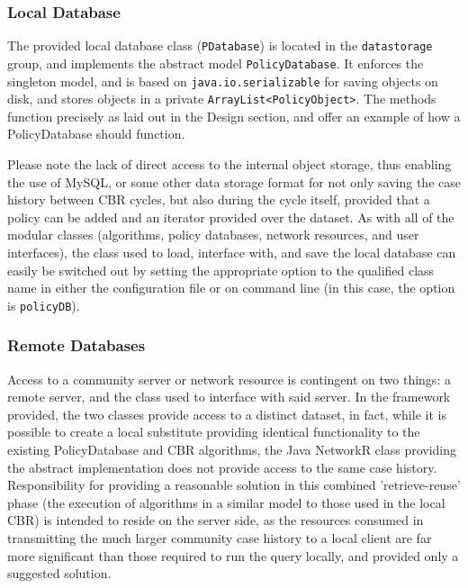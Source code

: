 \subsubsection{Local Database}
The provided local database class (\texttt{PDatabase}) is located in the \texttt{datastorage} group, and implements the abstract model \texttt{PolicyDatabase}. It enforces the singleton model, and is based on \texttt{java.io.serializable} for saving objects on disk, and stores objects in a private \texttt{ArrayList<PolicyObject>}. The methods function precisely as laid out in the Design section, and offer an example of how a PolicyDatabase should function.

Please note the lack of direct access to the internal object storage, thus enabling the use of MySQL, or some other data storage format for not only saving the case history between CBR cycles, but also during the cycle itself, provided that a policy can be added and an iterator provided over the dataset. As with all of the modular classes (algorithms, policy databases, network resources, and user interfaces), the class used to load, interface with, and save the local database can easily be switched out by setting the appropriate  option to the qualified class name in either the configuration file or on command line (in this case, the option is \texttt{policyDB}).

\subsubsection{Remote Databases}  
Access to a community server or network resource is contingent on two things: a remote server, and the class used to interface with said server. In the framework provided, the two classes provide access to a distinct dataset, in fact, while it is possible to create a local substitute providing identical functionality to the existing PolicyDatabase and CBR algorithms, the Java NetworkR class providing the abstract implementation does not provide access to the same case history. Responsibility for providing a reasonable solution in this combined 'retrieve-reuse' phase (the execution of algorithms in a similar model to those used in the local CBR) is intended to reside on the server side, as the resources consumed in transmitting the much larger community case history to a local client are far more significant than those required to run the query locally, and provided only a suggested solution.

